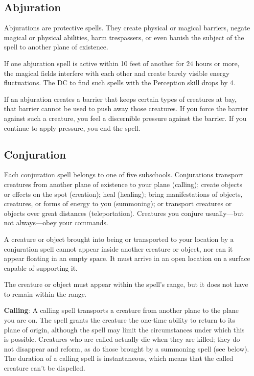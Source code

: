 \subsection{Abjuration}

				
Abjurations are protective spells. They create physical or magical barriers, negate magical or physical abilities, harm trespassers, or even banish the subject of the spell to another plane of existence. 
				
If one abjuration spell is active within 10 feet of another for 24 hours or more, the magical fields interfere with each other and create barely visible energy fluctuations. The DC to find such spells with the Perception skill drops by 4.
				
If an abjuration creates a barrier that keeps certain types of creatures at bay, that barrier cannot be used to push away those creatures. If you force the barrier against such a creature, you feel a discernible pressure against the barrier. If you continue to apply pressure, you end the spell.
				
\subsection{Conjuration}

				
Each conjuration spell belongs to one of five subschools. Conjurations transport creatures from another plane of existence to your plane (calling); create objects or effects on the spot (creation); heal (healing); bring manifestations of objects, creatures, or forms of energy to you (summoning); or transport creatures or objects over great distances (teleportation). Creatures you conjure usually---but not always---obey your commands.
				
A creature or object brought into being or transported to your location by a conjuration spell cannot appear inside another creature or object, nor can it appear floating in an empty space. It must arrive in an open location on a surface capable of supporting it.
				
The creature or object must appear within the spell's range, but it does not have to remain within the range.
				
\textbf{Calling}: A calling spell transports a creature from another plane to the plane you are on. The spell grants the creature the one-time ability to return to its plane of origin, although the spell may limit the circumstances under which this is possible. Creatures who are called actually die when they are killed; they do not disappear and reform, as do those brought by a summoning spell (see below). The duration of a calling spell is instantaneous, which means that the called creature can't be dispelled.
				
